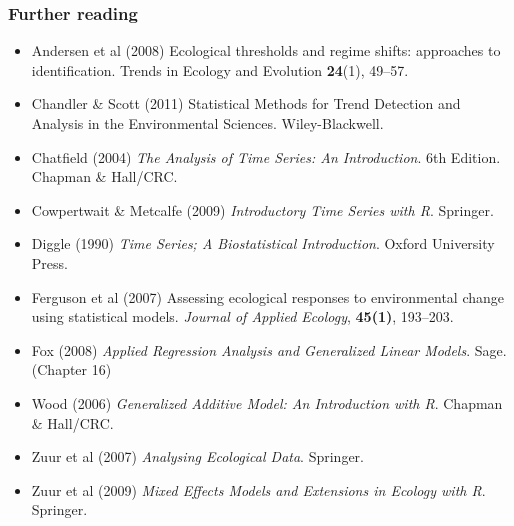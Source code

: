\documentclass{beamer}
\begin{document}
\begin{frame}
    \frametitle{Further reading}
    \footnotesize
    \begin{itemize}
        \item Andersen et al (2008) Ecological thresholds and regime shifts: approaches to identification. Trends in Ecology and Evolution \textbf{24}(1), 49--57.
        \item Chandler \& Scott (2011) Statistical Methods for Trend Detection and Analysis in the Environmental Sciences. Wiley-Blackwell.
        \item Chatfield (2004) \textit{The Analysis of Time Series: An Introduction}. 6th Edition. Chapman \& Hall/CRC.
        \item Cowpertwait \& Metcalfe (2009) \textit{Introductory Time Series with R}. Springer.
        \item Diggle (1990) \textit{Time Series; A Biostatistical Introduction}. Oxford University Press.
        \item Ferguson et al (2007) Assessing ecological responses to environmental change using statistical models. \textit{Journal of Applied Ecology}, \textbf{45(1)}, 193--203.
        \item Fox (2008) \textit{Applied Regression Analysis and Generalized Linear Models}. Sage. (Chapter 16)
        \item Wood (2006)\textit{ Generalized Additive Model: An Introduction with R}. Chapman \& Hall/CRC.
        \item Zuur et al (2007) \textit{Analysing Ecological Data}. Springer.
        \item Zuur et al (2009) \textit{Mixed Effects Models and Extensions in Ecology with R}. Springer.
    \end{itemize}
    \normalsize
\end{frame}
\end{document}
